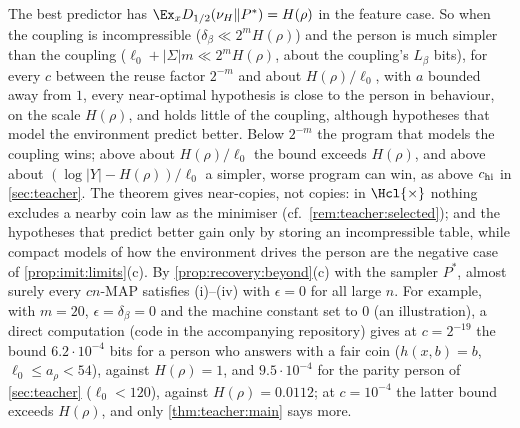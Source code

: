 The best predictor has $\Ex_xD_{1/2}(\nu_H\Vert P^*)=H(\rho)$ in the feature case. So when the coupling is incompressible ($\delta_\beta\ll2^mH(\rho)$) and the person is much simpler than the coupling ($\ell_0+|\Sigma|m\ll2^mH(\rho)$, about the coupling's $L_\beta$ bits), for every $c$ between the reuse factor $2^{-m}$ and about $H(\rho)/\ell_0$, with $a$ bounded away from $1$, every near-optimal hypothesis is close to the person in behaviour, on the scale $H(\rho)$, and holds little of the coupling, although hypotheses that model the environment predict better. Below $2^{-m}$ the program that models the coupling wins; above about $H(\rho)/\ell_0$ the bound exceeds $H(\rho)$, and above about $(\log|Y|-H(\rho))/\ell_0$ a simpler, worse program can win, as above $c_{\rm hi}$ in \cref{sec:teacher}. The theorem gives near-copies, not copies: in $\Hcl{\times}$ nothing excludes a nearby coin law as the minimiser (cf.\ \cref{rem:teacher:selected}); and the hypotheses that predict better gain only by storing an incompressible table, while compact models of how the environment drives the person are the negative case of \cref{prop:imit:limits}(c). By \cref{prop:recovery:beyond}(c) with the sampler $P^*$, almost surely every $cn$-MAP satisfies (i)--(iv) with $\epsilon=0$ for all large $n$. For example, with $m=20$, $\epsilon=\delta_\beta=0$ and the machine constant set to $0$ (an illustration), a direct computation (code in the accompanying repository) gives at $c=2^{-19}$ the bound $6.2\cdot10^{-4}$ bits for a person who answers with a fair coin ($h(x,b)=b$, $\ell_0\le a_\rho<54$), against $H(\rho)=1$, and $9.5\cdot10^{-4}$ for the parity person of \cref{sec:teacher} ($\ell_0<120$), against $H(\rho)=0.0112$; at $c=10^{-4}$ the latter bound exceeds $H(\rho)$, and only \cref{thm:teacher:main} says more.

